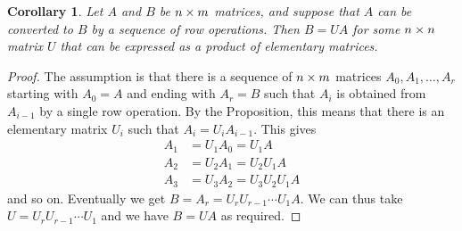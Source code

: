 \documentclass[reqno]{amsart}
\newtheorem{corollary}[theorem]{Corollary}
\theoremstyle{definition}
\begin{document}
\begin{corollary}\label{cor-ro-elem}
 Let $A$ and $B$ be $n\times m$ matrices, and suppose that $A$ can be
 converted to $B$ by a sequence of row operations.  Then $B=UA$ for
 some $n\times n$ matrix $U$ that can be expressed as a product of
 elementary matrices.
\end{corollary}
\begin{proof}
 The assumption is that there is a sequence of $n\times m$ matrices
 $A_0,A_1,\dotsc,A_r$ starting with $A_0=A$ and ending with $A_r=B$
 such that $A_i$ is obtained from $A_{i-1}$ by a single row
 operation.  By the Proposition, this means that there is an
 elementary matrix $U_i$ such that $A_i=U_iA_{i-1}$.  This gives
 \begin{align*}
  A_1 &= U_1A_0 = U_1A \\
  A_2 &= U_2A_1 = U_2U_1A \\
  A_3 &= U_3A_2 = U_3U_2U_1A
 \end{align*}
 and so on.  Eventually we get $B=A_r=U_rU_{r-1}\dotsb U_1A$.  We can
 thus take $U=U_rU_{r-1}\dotsb U_1$ and we have $B=UA$ as required.
\end{proof}
\end{document}
